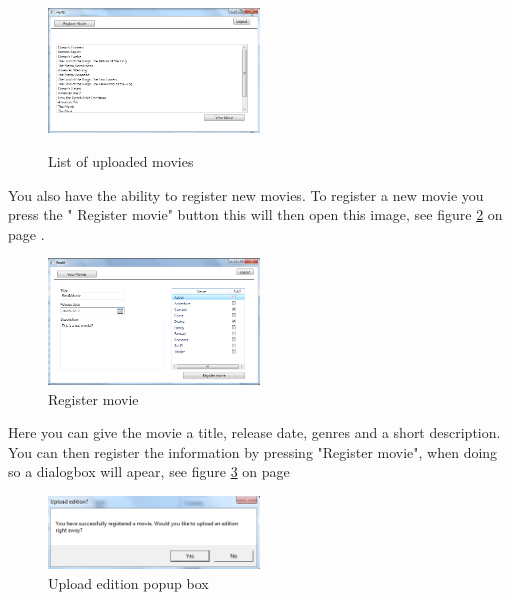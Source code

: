 \begin{figure}[h!]  
  \centering
\includegraphics[width=0.5\textwidth]{Parts/Images/Manual/CPmovielist}
\label{fig:Manual_Client_Navigation_Upload_List}
\caption{List of uploaded movies}
\end{figure}
 
 You also have the ability to register new movies. To register a new movie you press the " Register movie" button this will then open this image, see figure \ref{fig:Manual_Client_Navigation_Upload_Register} on page \pageref{fig:Manual_Client_Navigation_Upload_Register}.


\begin{figure}[h!]  
  \centering
\includegraphics[width=0.5\textwidth]{Parts/Images/Manual/CPRegistermovie}
\caption{Register movie}
\label{fig:Manual_Client_Navigation_Upload_Register}
\end{figure}
 
 Here you can give the movie a title,  release date, genres and a short description. You can then register the information by pressing "Register movie", when doing so a dialogbox will apear, see figure \ref{fig:Manual_Client_Navigation_Upload_Popup} on page \pageref{fig:Manual_Client_Navigation_Upload_Popup}


\begin{figure}[h!]  
  \centering
\includegraphics[width=0.5\textwidth]{Parts/Images/Manual/RegisterPopup}
\caption{Upload edition popup box}
\label{fig:Manual_Client_Navigation_Upload_Popup}
\end{figure}
 
